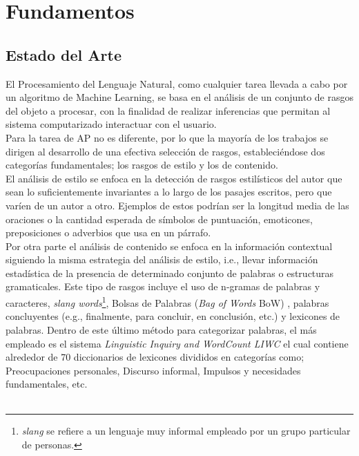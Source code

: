 
\chapter{Fundamentos}

\section{Estado del Arte}

El Procesamiento del Lenguaje Natural, como cualquier tarea llevada a cabo por un algoritmo de Machine Learning, se basa en el análisis de un conjunto de rasgos del objeto a procesar, con la finalidad de realizar inferencias que permitan al sistema computarizado interactuar con el usuario.
\\
Para la tarea de  AP no es diferente, por lo que la mayoría de los trabajos se dirigen al desarrollo de una efectiva selección de rasgos, estableciéndose dos categorías fundamentales; los rasgos de estilo y los de contenido.  
\\
El análisis de estilo se enfoca en la detección de rasgos estilísticos del autor que sean lo suficientemente invariantes a lo largo de los pasajes escritos, pero que varíen de un autor a otro. Ejemplos de estos podrían ser la longitud media de las oraciones o la cantidad esperada de símbolos de puntuación, emoticones, preposiciones o  adverbios que usa en un párrafo.
\\
Por otra parte el análisis de contenido se enfoca en la información contextual siguiendo la misma estrategia del análisis de estilo, i.e., llevar información estadística de la presencia de determinado conjunto de palabras o estructuras gramaticales. Este tipo de rasgos incluye el uso de n-gramas de palabras y caracteres, \textit{slang words}\footnote{ \textit{slang} se refiere a un lenguaje muy informal empleado por un grupo particular de personas.}, Bolsas de Palabras (\textit{Bag of Words} BoW) \citep{DBLP:conf/clef/Pizarro19,DBLP:conf/clef/Valencia-Valencia19}, palabras concluyentes (e.g., finalmente, para concluir, en conclusión, etc.)  y lexicones de palabras.
Dentro de este último método para categorizar palabras, el más empleado es el sistema \textit{Linguistic Inquiry and WordCount LIWC} \citep{pennebaker2015development} el cual contiene alrededor de 70 diccionarios de lexicones divididos en categorías como; Preocupaciones personales, Discurso informal, Impulsos y necesidades fundamentales, etc.
\\\\
